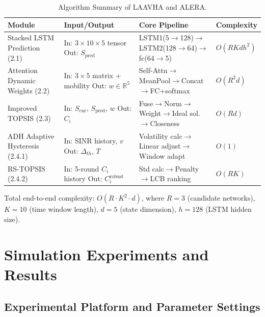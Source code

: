 \documentclass[journal,article,submit,moreauthors]{Definitions/mdpi}
\begin{document}
\begin{table}[h]
\caption{Algorithm Summary of LAAVHA and ALERA.}
\label{tab:algo}
\centering
\begin{tabular}{p{3.5cm} p{3cm} p{4.5cm} p{2cm}}
\toprule
\textbf{Module} & \textbf{Input/Output} & \textbf{Core Pipeline} & \textbf{Complexity} \\
\midrule
Stacked LSTM Prediction (2.1) & In: $3 \times 10 \times 5$ tensor \newline Out: $S_{\text{pred}}$ & LSTM1(5$\rightarrow$128)$\rightarrow$LSTM2(128$\rightarrow$64)$\rightarrow$fc(64$\rightarrow$5) & $O(R K d h^2)$ \\
\midrule
Attention Dynamic Weights (2.2) & In: $3 \times 5$ matrix + mobility \newline Out: $w \in \mathbb{R}^5$ & Self-Attn$\rightarrow$MeanPool$\rightarrow$Concat$\rightarrow$FC+softmax & $O(R^2 d)$ \\
\midrule
Improved TOPSIS (2.3) & In: $S_{\text{cur}}$, $S_{\text{pred}}$, $w$ \newline Out: $C_i$ & Fuse$\rightarrow$Norm$\rightarrow$Weight$\rightarrow$Ideal sol.$\rightarrow$Closeness & $O(R d)$ \\
\midrule
ADH Adaptive Hysteresis (2.4.1) & In: SINR history, $v$ \newline Out: $\Delta_{th}$, $T$ & Volatility calc$\rightarrow$Linear adjust$\rightarrow$Window adapt & $O(1)$ \\
\midrule
RS-TOPSIS (2.4.2) & In: 5-round $C_i$ history \newline Out: $C_i^{\text{robust}}$ & Std calc$\rightarrow$Penalty$\rightarrow$LCB ranking & $O(R K)$ \\
\bottomrule
\end{tabular}
\end{table}

Total end-to-end complexity: $O(R \cdot K^2 \cdot d)$, where $R = 3$ (candidate networks), $K = 10$ (time window length), $d = 5$ (state dimension), $h = 128$ (LSTM hidden size).

\section{Simulation Experiments and Results}
\label{sec:experiments}

\subsection{Experimental Platform and Parameter Settings}
\label{sec:setup}
\end{document}
